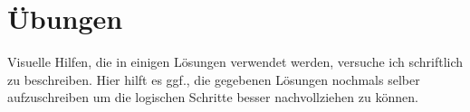 \section{Übungen}
Visuelle Hilfen, die in einigen Lösungen verwendet werden, versuche ich schriftlich zu beschreiben. Hier hilft es ggf., die gegebenen Lösungen nochmals selber aufzuschreiben um die logischen Schritte besser nachvollziehen zu können.








\newpage


\newpage
{}


\newpage

